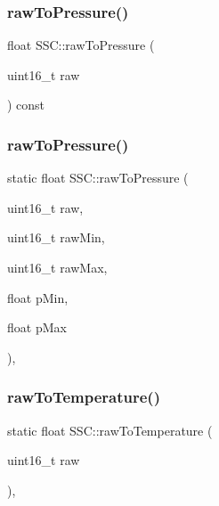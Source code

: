 \mbox{\label{class_s_s_c_ab595efde0ee85f72c474730b204c3acd}} 
\subsubsection{\texorpdfstring{raw\+To\+Pressure()}{rawToPressure()}\hspace{0.1cm}{\footnotesize\ttfamily [1/2]}}
{\footnotesize\ttfamily float S\+S\+C\+::raw\+To\+Pressure (\begin{DoxyParamCaption}\item[{uint16\+\_\+t}]{raw }\end{DoxyParamCaption}) const\hspace{0.3cm}{\ttfamily [inline]}}

\mbox{\label{class_s_s_c_ad69ac5f79eea773ecad17b79c255da1d}} 
\subsubsection{\texorpdfstring{raw\+To\+Pressure()}{rawToPressure()}\hspace{0.1cm}{\footnotesize\ttfamily [2/2]}}
{\footnotesize\ttfamily static float S\+S\+C\+::raw\+To\+Pressure (\begin{DoxyParamCaption}\item[{uint16\+\_\+t}]{raw,  }\item[{uint16\+\_\+t}]{raw\+Min,  }\item[{uint16\+\_\+t}]{raw\+Max,  }\item[{float}]{p\+Min,  }\item[{float}]{p\+Max }\end{DoxyParamCaption})\hspace{0.3cm}{\ttfamily [inline]}, {\ttfamily [static]}}

\mbox{\label{class_s_s_c_a0e037164770fcffaef6386e13fdbec95}} 
\subsubsection{\texorpdfstring{raw\+To\+Temperature()}{rawToTemperature()}}
{\footnotesize\ttfamily static float S\+S\+C\+::raw\+To\+Temperature (\begin{DoxyParamCaption}\item[{uint16\+\_\+t}]{raw }\end{DoxyParamCaption})\hspace{0.3cm}{\ttfamily [inline]}, {\ttfamily [static]}}

